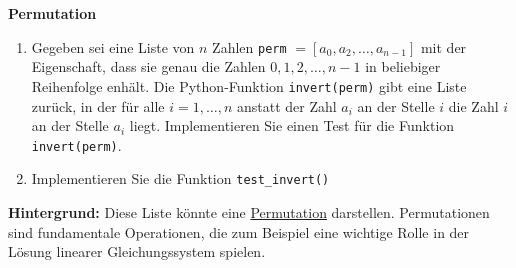 \textbf{Permutation}
\begin{enumerate}
	\item Gegeben sei eine Liste von $n$ Zahlen \verb|perm| $=[a_0, a_2, \dots, a_{n-1}]$ mit der Eigenschaft, dass sie genau die Zahlen $0, 1, 2, \dots, n-1$ in beliebiger Reihenfolge enhält. Die Python-Funktion \verb|invert(perm)| gibt eine Liste zurück, in der für alle $i = 1,\dots,n$ anstatt der Zahl $a_i$ an der Stelle $i$ die Zahl $i$ an der Stelle $a_i$ liegt. Implementieren Sie einen Test für die Funktion \verb|invert(perm)|.
	\item Implementieren Sie die Funktion \verb|test_invert()|
\end{enumerate}

\textbf{Hintergrund: } Diese Liste könnte eine \hyperref{https://de.wikipedia.org/wiki/Permutation#Definition}{}{}{Permutation} darstellen. Permutationen sind fundamentale Operationen, die zum Beispiel eine wichtige Rolle in der Lösung linearer Gleichungssystem spielen. \\
